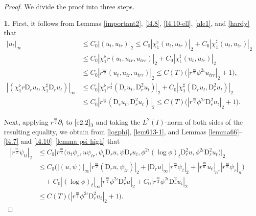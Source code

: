 \documentclass[11pt,reqno]{amsart}
\numberwithin{rk}{section}
\numberwithin{prop}{section}
\numberwithin{mydef}{section}
\numberwithin{lem}{section}
\numberwithin{equation}{section}
\numberwithin{thm}{section}
\begin{document}
\begin{proof} We divide the proof into three steps.

\smallskip
\textbf{1.} 
First, it follows from Lemmas \ref{important2}, \ref{l4.8}, \ref{l4.10-ell}, \ref{ale1}, and \ref{hardy} that
\begin{equation}\label{lem613-1}
\begin{aligned}
|u_t|_\infty&\leq C_0|(u_t,u_{tr})|_2\leq C_0|\chi_1^\flat (u_t,u_{tr})|_2+C_0|\chi_1^\sharp (u_t,u_{tr})|_2\\
&\leq C_0|\chi_1^\flat r(u_t,u_{tr},u_{trr})|_2+C_0|\chi_1^\sharp (u_t,u_{tr})|_2\\
&\leq C_0  |r^\frac{m}{2}(u_t,u_{tr},u_{trr})|_2 \leq C(T) \big(|r^\frac{m}{2}\phi^{2\iota}u_{trr}|_2+1\big),\\
|(\chi_1^\flat r\mathrm{D}_r u_t,\chi_1^\sharp \mathrm{D}_r u_t)|_\infty &\leq C_0|\chi_1^\flat r^\frac{3}{2}(\mathrm{D}_r u_t,\mathrm{D}_r^2 u_t)|_2+ C_0|\chi_1^\sharp (\mathrm{D}_r u_t,\mathrm{D}_r^2 u_t)|_2\\
&\leq C_0 |r^\frac{m}{2}(\mathrm{D}_r u_t,\mathrm{D}_r^2 u_t)|_2 \leq C(T) \big(|r^\frac{m}{2}\phi^{2\iota}\mathrm{D}_r^2 u_t|_2+1\big).
\end{aligned}    
\end{equation}


Next, applying $r^\frac{m}{2}\partial_t$ to $\eqref{e2.2}_3$ and taking the $L^2(I)$-norm of both sides of the resulting equality, we obtain from \eqref{logphi}, \eqref{lem613-1}, and
Lemmas \ref{lemma66}--\ref{l4.7} and \ref{l4.10}--\ref{lemma-psi-high} that
\begin{equation}\label{lem613-1'}
\begin{aligned}
|r^\frac{m}{2}\psi_{tt}|_2&\leq C_0\big|r^\frac{m}{2}\big(u_t\psi_r,u\psi_{tr},\psi_t \mathrm{D}_r u,\psi \mathrm{D}_r u_t,\phi^{2\iota}(\log\phi)_t\mathrm{D}_r^2 u,\phi^{2\iota}\mathrm{D}_r^2 u_t\big)\big|_2\\
&\leq C_0\big(|(u,\psi)|_\infty |r^\frac{m}{2}(\mathrm{D}_r u,\psi_{tr})|_2+|\mathrm{D}_r u|_\infty|r^\frac{m}{2}\psi_t|_2+|r^\frac{m}{n^*}u_t|_{n^*}|r^\frac{m}{n}\psi_r|_n\big)\\
&\quad +C_0|(\log\phi)_t|_\infty|r^\frac{m}{2}\phi^{2\iota}\mathrm{D}_r^2 u|_2+C_0|r^\frac{m}{2}\phi^{2\iota}\mathrm{D}_r^2 u_t|_2\\
&\leq C(T) \big(|r^\frac{m}{2}\phi^{2\iota}\mathrm{D}_r^2 u_t|_2+1\big).
\end{aligned}
\end{equation}


\end{proof}
\end{document}
